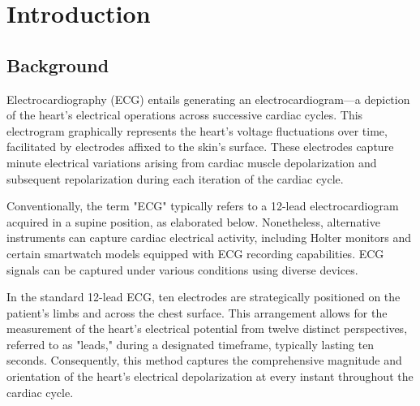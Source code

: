 \documentclass{zc-ust-hw}
\begin{document}
\maketitle
\tableofcontents
\listoffigures


\newpage

\section{Introduction}

\subsection{Background}

Electrocardiography (ECG) entails generating an electrocardiogram—a depiction
of the heart's electrical operations across successive cardiac cycles. This
electrogram graphically represents the heart's voltage fluctuations over time,
facilitated by electrodes affixed to the skin's surface. These electrodes
capture minute electrical variations arising from cardiac muscle depolarization
and subsequent repolarization during each iteration of the cardiac cycle.
\cite{lilly_2016_pathophysiology}

Conventionally, the term "ECG" typically refers to a 12-lead electrocardiogram
acquired in a supine position, as elaborated below. Nonetheless, alternative
instruments can capture cardiac electrical activity, including Holter monitors
and certain smartwatch models equipped with ECG recording capabilities. ECG
signals can be captured under various conditions using diverse devices.
\cite{lilly_2016_pathophysiology}

In the standard 12-lead ECG, ten electrodes are strategically positioned on the
patient's limbs and across the chest surface. This arrangement allows for the
measurement of the heart's electrical potential from twelve distinct
perspectives, referred to as "leads," during a designated timeframe, typically
lasting ten seconds. Consequently, this method captures the comprehensive
magnitude and orientation of the heart's electrical depolarization at every
instant throughout the cardiac cycle. \cite{lilly_2016_pathophysiology}
\end{document}
